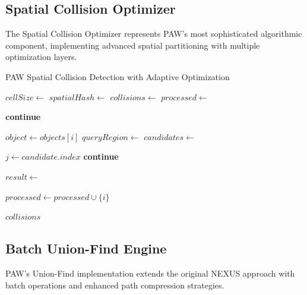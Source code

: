 \documentclass[10pt]{article}
\begin{document}
\subsection{Spatial Collision Optimizer}

The Spatial Collision Optimizer represents PAW's most sophisticated algorithmic component, implementing advanced spatial partitioning with multiple optimization layers.

\begin{algorithm}
\caption{PAW Spatial Collision Detection with Adaptive Optimization}
\begin{algorithmic}[1]
    \State $cellSize \gets$ 
    \State $spatialHash \gets$ 
    \State $collisions \gets$ 
    \State $processed \gets$ 
    
            \State \textbf{continue}
        \EndIf
        
        \State $object \gets objects[i]$
        \State $queryRegion \gets$ 
        \State $candidates \gets$ 
        
            \State $j \gets candidate.index$
                \State \textbf{continue}
            \EndIf
            
            \State $result \gets$ 
                \State {}
            \EndIf
        \EndFor
        
        \State $processed \gets processed \cup \{i\}$
    \EndFor
    
    \State \Return $collisions$
\EndFunction
\end{algorithmic}
\end{algorithm}

\subsection{Batch Union-Find Engine}

PAW's Union-Find implementation extends the original NEXUS approach with batch operations and enhanced path compression strategies.
\end{document}
